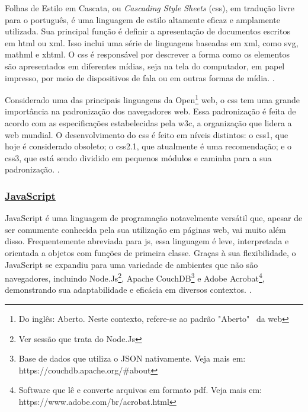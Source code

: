 Folhas de Estilo em Cascata, ou \textit{Cascading Style Sheets}
(\acrshort{css}),
em tradução livre
para o português, é uma linguagem de estilo altamente eficaz e amplamente utilizada. Sua
principal função é definir a apresentação de documentos escritos em
\acrshort{html}
ou
\acrshort{xml}.
Isso
inclui uma série de linguagens baseadas em
\acrshort{xml},
como
\acrshort{svg},
\acrshort{mathml}
e
\acrshort{xhtml}.
O
\acrshort{css}
é
responsável por descrever a forma como os elementos são apresentados em diferentes mídias,
seja na tela do computador, em papel impresso, por meio de dispositivos de fala ou em outras
formas de mídia.
\cite{mdn-css}.

Considerado uma das principais linguagens da
Open\footnote{Do inglês: Aberto. Neste contexto, refere-se ao padrão "Aberto"~ da
    \acrshort{web}
}
\acrshort{web},
o
\acrshort{css}
tem uma grande
importância na padronização dos navegadores
\acrshort{web}.
Essa padronização é feita de acordo com
as especificações estabelecidas pela
\acrshort{w3c},
a organização que lidera a
\acrshort{web}
mundial. O
desenvolvimento do
\acrshort{css}
é feito em níveis distintos: o
\acrshort{css}1,
que hoje é considerado
obsoleto; o
\acrshort{css}2.1,
que atualmente é uma recomendação; e o
\acrshort{css}3,
que está sendo dividido
em pequenos módulos e caminha para a sua padronização.
\cite{mdn-css}.

\subsubsection{\underline{JavaScript}}

JavaScript é uma linguagem de programação notavelmente versátil que, apesar de ser
comumente conhecida pela sua utilização em páginas
\acrshort{web}, vai muito além disso.
Frequentemente abreviada para 
\acrshort{js}, essa linguagem é leve, interpretada e orientada a objetos
com funções de primeira classe. Graças à sua flexibilidade, o JavaScript se expandiu para uma
variedade de ambientes que não são navegadores, incluindo
Node.Js\footnote{Ver sessão que trata do Node.Js
},
Apache CouchDB\footnote{Base de dados que utiliza o JSON nativamente. Veja mais em:  \\ https://couchdb.apache.org/\#about
}
e
Adobe Acrobat\footnote{Software que lê e converte arquivos em formato
    \acrshort{pdf}. Veja mais em:  \\ https://www.adobe.com/br/acrobat.html
},
demonstrando sua adaptabilidade e eficácia em diversos contextos.
\cite{mdn-js}.

